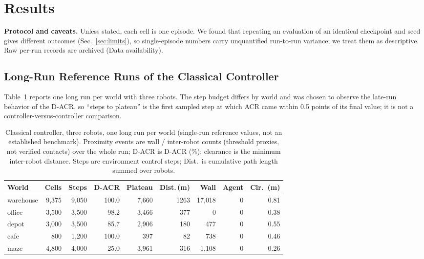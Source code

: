 \documentclass[conference]{IEEEtran}
\begin{document}
\section{Results}
\label{sec:results}
\textbf{Protocol and caveats.} Unless stated, each cell is one episode. We
found that repeating an evaluation of an identical checkpoint and seed gives
different outcomes (Sec.~\ref{sec:limits}), so single-episode numbers carry
unquantified run-to-run variance; we treat them as descriptive. Raw per-run
records are archived (Data availability).

\subsection{Long-Run Reference Runs of the Classical Controller}
Table~\ref{tab:ceil} reports one long run per world with three robots. The
step budget differs by world and was chosen to observe the late-run behavior of the D-ACR,
so ``steps to plateau'' is the first sampled step at which ACR came within
0.5 points of its final value; it is not a controller-versus-controller
comparison.

\begin{table}[t]
\centering
\caption{Classical controller, three robots, one long run per world (single-run reference values, not an established benchmark). Proximity events are wall / inter-robot counts (threshold proxies, not verified contacts) over the whole run; D-ACR is D-ACR (\%); clearance is the minimum inter-robot distance. Steps are environment control steps; Dist.\ is cumulative path length summed over robots.}
\label{tab:ceil}
\footnotesize
\setlength{\tabcolsep}{2.2pt}
\begin{tabular}{@{}lrrrrrrrr@{}}
\toprule
World & Cells & Steps & D-ACR & Plateau & Dist.\,(m) & Wall & Agent & Clr.\ (m) \\
\midrule
warehouse & 9{,}375 & 9{,}050 & 100.0 & 7{,}660 & 1263 & 17{,}018 & 0 & 0.81 \\
office & 3{,}500 & 3{,}500 & 98.2 & 3{,}466 & 377 & 0 & 0 & 0.38 \\
depot & 3{,}000 & 3{,}500 & 85.7 & 2{,}906 & 180 & 477 & 0 & 0.55 \\
cafe & 800 & 1{,}200 & 100.0 & 397 & 82 & 738 & 0 & 0.46 \\
maze & 4{,}800 & 4{,}000 & 25.0 & 3{,}961 & 316 & 1{,}108 & 0 & 0.26 \\
\bottomrule
\end{tabular}
\end{table}
\end{document}
